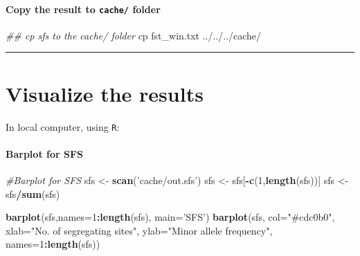 \documentclass[]{article}
\newenvironment{Shaded}{\begin{snugshade}}{\end{snugshade}}
\newcommand{\CommentTok}[1]{\textcolor[rgb]{0.56,0.35,0.01}{\textit{#1}}}
\newcommand{\DataTypeTok}[1]{\textcolor[rgb]{0.13,0.29,0.53}{#1}}
\newcommand{\DecValTok}[1]{\textcolor[rgb]{0.00,0.00,0.81}{#1}}
\newcommand{\FunctionTok}[1]{\textcolor[rgb]{0.00,0.00,0.00}{#1}}
\newcommand{\KeywordTok}[1]{\textcolor[rgb]{0.13,0.29,0.53}{\textbf{#1}}}
\newcommand{\NormalTok}[1]{#1}
\newcommand{\OperatorTok}[1]{\textcolor[rgb]{0.81,0.36,0.00}{\textbf{#1}}}
\newcommand{\StringTok}[1]{\textcolor[rgb]{0.31,0.60,0.02}{#1}}
\let\oldparagraph\paragraph
\renewcommand{\paragraph}[1]{\oldparagraph{#1}\mbox{}}
\begin{document}
\hypertarget{copy-the-result-to-cache-folder-1}{%
\paragraph{\texorpdfstring{Copy the result to \texttt{cache/}
folder}{Copy the result to cache/ folder}}\label{copy-the-result-to-cache-folder-1}}

\begin{Shaded}
\begin{Highlighting}[]
\CommentTok{## cp sfs to the cache/ folder}
\FunctionTok{cp}\NormalTok{ fst_win.txt ../../../cache/}
\end{Highlighting}
\end{Shaded}

\begin{center}\rule{0.5\linewidth}{0.5pt}\end{center}

\hypertarget{visualize-the-results}{%
\section{Visualize the results}\label{visualize-the-results}}

In local computer, using \texttt{R}:

\hypertarget{barplot-for-sfs}{%
\paragraph{Barplot for SFS}\label{barplot-for-sfs}}

\begin{Shaded}
\begin{Highlighting}[]
\CommentTok{#Barplot for SFS}
\NormalTok{sfs <-}\StringTok{ }\KeywordTok{scan}\NormalTok{(}\StringTok{'cache/out.sfs'}\NormalTok{)}
\NormalTok{sfs <-}\StringTok{ }\NormalTok{sfs[}\OperatorTok{-}\KeywordTok{c}\NormalTok{(}\DecValTok{1}\NormalTok{,}\KeywordTok{length}\NormalTok{(sfs))]}
\NormalTok{sfs <-}\StringTok{ }\NormalTok{sfs}\OperatorTok{/}\KeywordTok{sum}\NormalTok{(sfs)}

\KeywordTok{barplot}\NormalTok{(sfs,}\DataTypeTok{names=}\DecValTok{1}\OperatorTok{:}\KeywordTok{length}\NormalTok{(sfs), }\DataTypeTok{main=}\StringTok{'SFS'}\NormalTok{)}
\KeywordTok{barplot}\NormalTok{(sfs, }\DataTypeTok{col=}\StringTok{"#cdc0b0"}\NormalTok{, }\DataTypeTok{xlab=}\StringTok{"No. of segregating sites"}\NormalTok{, }
        \DataTypeTok{ylab=}\StringTok{"Minor allele frequency"}\NormalTok{, }
        \DataTypeTok{names=}\DecValTok{1}\OperatorTok{:}\KeywordTok{length}\NormalTok{(sfs))}
\end{Highlighting}
\end{Shaded}
\end{document}
